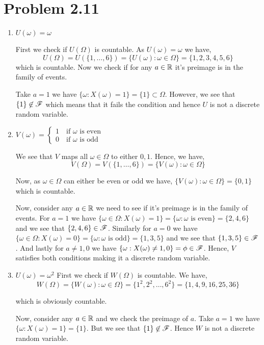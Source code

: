 \documentclass[a4paper]{report}
\begin{document}
\section*{Problem 2.11}
\begin{enumerate}
	\item $U(\omega) = \omega$
	
	First we check if $U(\Omega)$ is countable. As  $U(\omega) = \omega$ we have, 
	$$ U(\Omega) = U(\{1, \dots, 6\} )  = \{U(\omega): \omega \in \Omega\} =  \{1, 2, 3, 4, 5, 6\} $$ 
	which is countable. Now we check if for any $a \in \mathbb{R}$ it's preimage is in the family of events.

	 \vspace{1em}
	
	 Take $a = 1$ we have  $\{\omega: X(\omega) = 1\} = \{1\} \subset \Omega $. However, we see that $\{1\} \not \in \mathscr{F}$ which means that it fails the condition and hence $U$ is not a discrete random variable.

	\item $V(\omega) = \begin{cases}1 \quad \text{if $\omega$ is even}\\0 \quad \text{if $\omega$ is odd}  \end{cases}$

	We see that $V$ maps all $\omega \in \Omega$ to either  $0, 1$. Hence, we have,  
	$$ V(\Omega) = V(\{1, \dots, 6\} ) = \{V(\omega) : \omega \in \Omega\}  $$ 

	Now, as $\omega \in \Omega$ can either be even or odd we have,  $\{V(\omega) : \omega \in \Omega\} = \{0, 1\}$ which is countable.

	\vspace{1em}
	
	Now, consider any $a \in \mathbb{R}$ we need to see if it's preimage  is in the family of events. For $a = 1$ we have  $\{\omega \in \Omega: X(\omega) = 1\} = \{\omega: \omega \text{ is even} \} = \{2,4,6\}$ and we see that $\{2,4,6\} \in \mathscr{F} $. Similarly for $a = 0$ we have  $\{\omega \in \Omega: X(\omega) = 0\} = \{\omega: \omega \text{ is odd} \} = \{1,3,5\}$ and we see that $\{1,3,5\} \in \mathscr{F}$. And lastly for $a \ne 1,0$ we have $\{\omega: X(\omega) \ne 1, 0\} = \phi \in \mathscr{F}$. Hence, $V$ satisfies both conditions making it a discrete random variable.
	
	\item $U(\omega) = \omega^2$
		First we check if $W(\Omega)$ is countable. We have,  
		$$ W(\Omega) = \{W(\omega): \omega \in \Omega\} = \{1^2, 2^2, \dots, 6^2\} = \{1, 4, 9, 16, 25, 36\}    $$ 

		which is obviously countable.

		\vspace{1em}
		
		Now, consider any $a \in \mathbb{R}$ and we check the preimage of  $a$. Take $a = 1$ we have  $\{\omega: X(\omega) = 1\} = \{1\} $. But we see that $\{1\} \not \in \mathscr{F} $. Hence $W$ is not a discrete random variable.

	
\end{enumerate}
\end{document}
